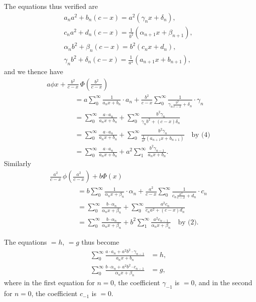 \documentclass[12pt,a4paper,oneside]{book}
\theoremstyle{plain}
\theoremstyle{definition}
\theoremstyle{remark}
\begin{document}
The equations thus verified are
\begin{gather*}
a_n a^2 + b_n(c-x) = a^2(\gamma_n x + \delta_n),\tag{1}\\
c_n a^2 + d_n(c-x) = \frac{1}{b^2}(\alpha_{n+1} x + \beta_{n+1}),\tag{2}\\
\alpha_n b^2 + \beta_n(c-x) = b^2(c_n x + d_n),\tag{3}\\
\gamma_n b^2 + \delta_n(c-x) = \frac{1}{a^2}(a_{n+1} x + b_{n+1}),\tag{4}
\end{gather*}
and we thence have
\begin{gather*}
a\phi x + \frac{b^2}{c-x}\,\Phi\!\left(\frac{b^2}{c-x}\right)\\
\qquad\qquad = a\sum_0^\infty\frac{1}{a_n x+b_n}\cdot a_n
   + \frac{b^2}{c-x}\sum_0^\infty\frac{1}{\gamma_n\frac{b^2}{c-x}+\delta_n}
     \cdot\gamma_n\\
\qquad\qquad = \sum_0^\infty \frac{a\cdot a_n}{a_n x+b_n}
   + \sum_0^\infty\frac{b^2\gamma_n}{\gamma_n b^2 + (c-x)\delta_n}\\
\qquad\qquad = \sum_0^\infty \frac{a\cdot a_n}{a_n x+b_n}
   + \sum_0^\infty\frac{b^2\gamma_n}{\frac{1}{a^2}(a_{n+1}x+b_{n+1})}\quad
   \text{by (4)}\\
\qquad\qquad = \sum_0^\infty \frac{a\cdot a_n}{a_n x+b_n}
   + a^2\sum_1^\infty\frac{b^2\gamma_{n-1}}{a_n x+b_n}.
\end{gather*}
Similarly
\begin{gather*}
\frac{a^2}{c-x}\,\phi\!\left(\frac{a^2}{c-x}\right) + b\Phi(x)\\
\qquad\qquad = b\sum_0^\infty\frac{1}{\alpha_n x+\beta_n}\cdot\alpha_n
   + \frac{a^2}{c-x}\sum_0^\infty\frac{1}{c_n\frac{a^2}{c-x}+d_n}\cdot c_n\\
\qquad\qquad = \sum_0^\infty \frac{b\cdot\alpha_n}{\alpha_n x+\beta_n}
   + \sum_0^\infty\frac{a^2 c_n}{c_n a^2 + (c-x)d_n}\\
\qquad\qquad = \sum_0^\infty \frac{b\cdot\alpha_n}{\alpha_n x+\beta_n}
   + b^2\sum_1^\infty\frac{a^2 c_{n-1}}{\alpha_n x+\beta_n}\quad
   \text{by (2)}.
\end{gather*}

The equations $=h$, $=g$ thus become
\begin{align*}
\sum_0^\infty\frac{a\cdot a_n + a^2b^2\cdot\gamma_{n-1}}{a_n x+b_n} &= h,\\
\sum_0^\infty\frac{b\cdot\alpha_n + a^2b^2\cdot c_{n-1}}{\alpha_n x+\beta_n} &= g,
\end{align*}
where in the first equation for $n=0$, the coefficient $\gamma_{-1}$ is $=0$, and in the second for $n=0$, the coefficient $c_{-1}$ is $=0$.
\end{document}
